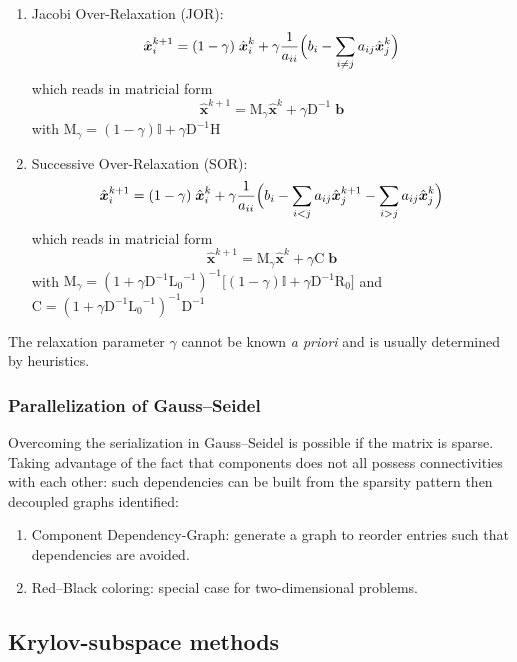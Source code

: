 \documentclass{article}
\newcommand{\bb}{{\boldsymbol b}}
\newcommand{\hx}{\hat{\boldsymbol x}}
\newcommand{\mC}{{\mathrm C}}
\newcommand{\mD}{{\mathrm D}}
\newcommand{\mH}{{\mathrm H}}
\newcommand{\mLs}{{\mathrm L_0}}
\newcommand{\mM}{{\mathrm M}}
\newcommand{\mRs}{{\mathrm R_0}}
\newcommand{\mII}{{\mathbf{\mathbb{I}}}}
\begin{document}
\medskip
\begin{enumerate}
\item Jacobi Over-Relaxation (JOR):
\begin{equation}
\hx^{k+1}_i = (1 - \gamma)\;\hx^{k}_i + \gamma \frac{1}{a_{ii}}\Bigl( b_i - \sum_{i\neq j} a_{ij} \hx^{k}_j \Bigr)
\end{equation}
which reads in matricial form
\[
\hx^{k+1} = \mM_\gamma \hx^{k} + \gamma\mD^{-1}\;\bb
\]
with $\mM_\gamma = (1-\gamma)\mII + \gamma\mD^{-1} \mH$

\medskip
\item Successive Over-Relaxation (SOR):
\begin{equation}
\hx^{k+1}_i = (1-\gamma)\;\hx^{k}_i + \gamma \frac{1}{a_{ii}}\Bigl( b_i - \sum_{i < j} a_{ij} \hx^{k+1}_j - \sum_{i > j} a_{ij} \hx^{k}_j \Bigr)
\end{equation}
which reads in matricial form
\[
\hx^{k+1} = \mM_\gamma \hx^{k} + \gamma\mC\;\bb
\]
with $\mM_\gamma = (1 + \gamma\mD^{-1}\mLs^{-1} )^{-1} \bigl[(1-\gamma)\mII + \gamma\mD^{-1} \mRs \bigr]$ and $\mC = (1 + \gamma\mD^{-1}\mLs^{-1} )^{-1} \mD^{-1}$
\end{enumerate}

\medskip
The relaxation parameter $\gamma$ cannot be known \textit{a priori} and is usually determined by heuristics.

\subsubsection{Parallelization of Gauss--Seidel}

Overcoming the serialization in Gauss--Seidel is possible if the matrix is sparse.
Taking advantage of the fact that components does not all possess connectivities with each other: such dependencies can be built from the sparsity pattern then decoupled graphs identified:
\begin{enumerate}
\item Component Dependency-Graph: generate a graph to reorder entries such that dependencies are avoided.
\item Red--Black coloring: special case for two-dimensional problems.
\end{enumerate}



\subsection{Krylov-subspace methods}
\end{document}
